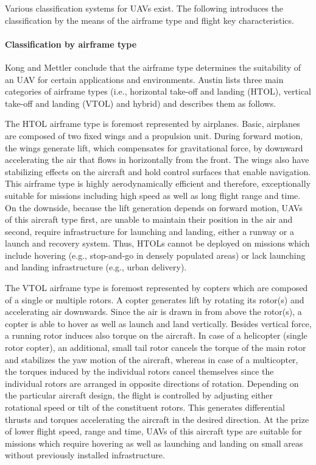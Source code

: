 Various classification systems for UAVs exist.
The following introduces the classification by the means of the airframe type and flight key characteristics.


\paragraph{Classification by airframe type}

Kong and Mettler \cite{Kong2010} conclude that the airframe type determines the suitability of an UAV for certain applications and environments.
Austin \cite{Austin2011} lists three main categories of airframe types
(i.e., horizontal take-off and landing (HTOL), vertical take-off and landing (VTOL) and hybrid)
and describes them as follows.

The HTOL airframe type is foremost represented by airplanes.
Basic, airplanes are composed of two fixed wings and a propulsion unit.
During forward motion, the wings generate lift, which compensates for gravitational force, by downward accelerating the air that flows in horizontally from the front.
The wings also have stabilizing effects on the aircraft and hold control surfaces that enable navigation.
This airframe type is highly aerodynamically efficient and therefore, exceptionally suitable for missions including high speed as well as long flight range and time.
On the downside, because the lift generation depends on forward motion, UAVs of this aircraft type first, are unable to maintain their position in the air 
and second, require infrastructure for launching and landing, either a runway or a launch and recovery system. \cite{Gleason2010}
Thus, HTOLs cannot be deployed on missions which include hovering (e.g., stop-and-go in densely populated areas) 
or lack launching and landing infrastructure (e.g., urban delivery).

The VTOL airframe type is foremost represented by copters which are composed of a single or multiple rotors.
A copter generates lift by rotating its rotor(s) and accelerating air downwards.
Since the air is drawn in from above the rotor(s), a copter is able to hover as well as launch and land vertically.
Besides vertical force, a running rotor induces also torque on the aircraft.
In case of a helicopter (single rotor copter), an additional, small tail rotor cancels the torque of the main rotor and stabilizes the yaw motion of the aircraft,
whereas in case of a multicopter, the torques induced by the individual rotors cancel themselves since the individual rotors are arranged in opposite directions of rotation.
Depending on the particular aircraft design, the flight is controlled by adjusting either rotational speed or tilt of the constituent rotors.
This generates differential thrusts and torques accelerating the aircraft in the desired direction.
At the prize of lower flight speed, range and time, UAVs of this aircraft type are suitable for missions which
require hovering as well as launching and landing on small areas without previously installed infrastructure.

